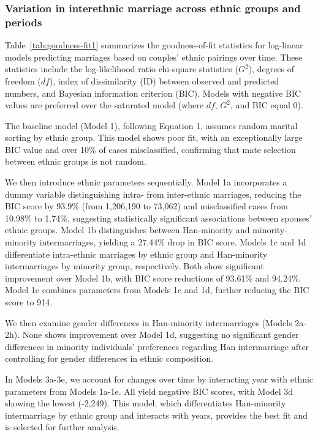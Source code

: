 \subsubsection{Variation in interethnic marriage across ethnic groups and periods}

Table~\ref{tab:goodness-fit1} summarizes the goodness-of-fit statistics for
log-linear models predicting marriages based on couples' ethnic pairings over
time.
These statistics include the log-likelihood ratio chi-square statistics ($G^2$),
degrees of freedom ($df$), index of dissimilarity (ID) between observed and
predicted numbers, and Bayesian information criterion (BIC).
Models with negative BIC values are preferred over the saturated model
(where $df$, $G^2$, and BIC equal 0).

The baseline model (Model 1), following Equation 1, assumes random marital
sorting by ethnic group.
This model shows poor fit, with an exceptionally large BIC value and over 10\%
of cases misclassified, confirming that mate selection between ethnic groups is
not random.

We then introduce ethnic parameters sequentially.
Model 1a incorporates a dummy variable distinguishing intra- from inter-ethnic
marriages, reducing the BIC score by 93.9\% (from 1,206,190 to 73,062) and
misclassified cases from 10.98\% to 1.74\%, suggesting statistically significant
associations between spouses' ethnic groups.
Model 1b distinguishes between Han-minority and minority-minority
intermarriages, yielding a 27.44\% drop in BIC score.
Models 1c and 1d differentiate intra-ethnic marriages by ethnic group and
Han-minority intermarriages by minority group, respectively.
Both show significant improvement over Model 1b, with BIC score reductions of
93.61\% and 94.24\%.
Model 1e combines parameters from Models 1c and 1d, further reducing the BIC
score to 914.

We then examine gender differences in Han-minority intermarriages
(Models 2a-2h).
None shows improvement over Model 1d, suggesting no significant gender
differences in minority individuals' preferences regarding Han intermarriage
after controlling for gender differences in ethnic composition.

In Models 3a-3e, we account for changes over time by interacting year with
ethnic parameters from Models 1a-1e.
All yield negative BIC scores, with Model 3d showing the lowest (-2,249).
This model, which differentiates Han-minority intermarriage by ethnic group and
interacts with years, provides the best fit and is selected for further
analysis.

